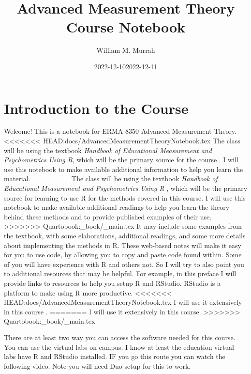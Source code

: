 \documentclass[
]{book}
\title{Advanced Measurement Theory Course Notebook}
\author{William M. Murrah}
\date{2022-12-10}
\date{2022-12-11}
\begin{document}
\maketitle

{
\setcounter{tocdepth}{1}
\tableofcontents
}
\hypertarget{introduction-to-the-course}{%
\chapter*{Introduction to the Course}\label{introduction-to-the-course}}

Welcome!
This is a notebook for ERMA 8350 Advanced Measurement Theory.
<<<<<<< HEAD:docs/AdvancedMeasurementTheoryNotebook.tex
The class will be using the textbook \emph{Handbook of Educational Measurement and Psychometrics Using R}, which will be the primary source for the course .
I will use this notebook to make available additional information to help you learn the material.
=======
The class will be using the textbook \emph{Handbook of Educational Measurement and Psychometrics Using R} \citep{Desjardins2018Handbookeducationalmeasurement}, which will be the primary source for learning to use R for the methods covered in this course.
I will use this notebook to make available additional readings to help you learn the theory behind these methods and to provide published examples of their use.
>>>>>>> Quartobook:_book/_main.tex
It may include some examples from the textbook, with some elaborations, additional readings, and some more details about implementing the methods in R.
These web-based notes will make it easy for you to use code, by allowing you to copy and paste code found within.
Some of you will have experience with R and others not.
So I will try to also point you to additional resources that may be helpful.
For example, in this preface I will provide links to resources to help you setup R and RStudio.
RStudio is a platform to make using R more productive.
<<<<<<< HEAD:docs/AdvancedMeasurementTheoryNotebook.tex
I will use it extensively in this course \citep{Desjardins2018Handbookeducationalmeasurement}.
=======
I will use it extensively in this course.
>>>>>>> Quartobook:_book/_main.tex

There are at least two way you can access the software needed for this course.
You can use the virtual labs on campus.
I know at least the education virtual labs have R and RStudio installed.
IF you go this route you can watch the following video.
Note you will need Duo setup for this to work.
\end{document}
